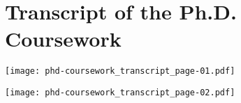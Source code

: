 \chapter{Transcript of the Ph.D. Coursework} \label{appendix:transcript}

    \begin{figure*}[!htb]
    	\centering
    	\texttt{[image: phd-coursework\_transcript\_page-01.pdf]}
    \end{figure*}
    
    \newpage
    \begin{figure*}[!htb]
    	\centering
    	\texttt{[image: phd-coursework\_transcript\_page-02.pdf]}
    \end{figure*}